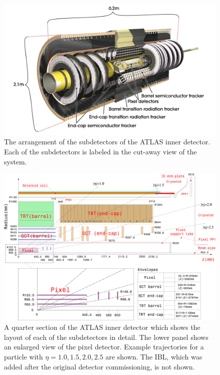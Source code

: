 \begin{figure}[hbtp]
\includegraphics[width=\fullfig]{figures/id_overview.pdf}
\caption{The arrangement of the subdetectors of the \ac{ATLAS} inner detector. Each of the subdetectors is labeled in the cut-away view of the system.}
\label{fig:id_overview}
\end{figure}

\begin{figure}[hbtp]
\includegraphics[width=\fullfig]{figures/id_detail_schematic.pdf}
\caption{A quarter section of the \ac{ATLAS} inner detector which shows the layout of each of the subdetectors in detail. The lower panel shows an enlarged view of the pixel detector. Example trajectories for a particle with $\eta = 1.0, 1.5, 2.0, 2.5$ are shown. The \ac{IBL}, which was added after the original detector commissioning, is not shown.}
\label{fig:id_detail_schematic}
\end{figure}

